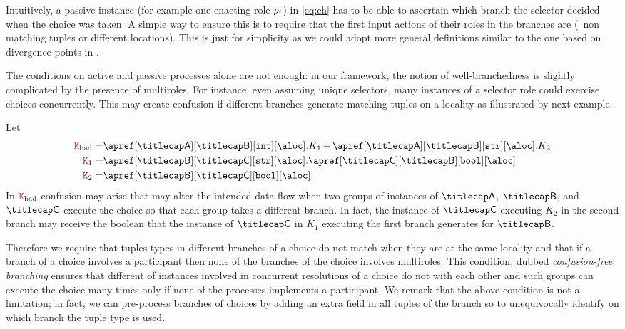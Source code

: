Intuitively, a passive instance (for example one enacting role
$\rho_i$) in \eqref{eq:ch} has to be able to ascertain which branch
the selector decided when the choice was taken.
%
A simple way to ensure this is to require that the first input actions
of their roles in the branches are  (\ie\ non matching
tuples or different locations).
%
This is just for simplicity as we could adopt more general definitions
similar to the one based on divergence points in \cite{gt16,gt17}.

The conditions on active and passive processes alone are not enough:
in our framework, the notion of well-branchedness is slightly
complicated by the presence of multiroles.
%
For instance, even assuming unique selectors, many instances of a
selector role could exercise choices concurrently.
%
This may create confusion if different branches generate matching
tuples on a locality as illustrated by next example.
\begin{example}\label{ex:nonwb}
  Let
  \begin{align*}
    \aK_\mathrm{bad} = & \apref[\amulti A][\amulti B][{\asort[int]}][\aloc] \mkop{.} K_1 \chop \apref[\amulti A][\amulti B][{\asort[str]}][\aloc] \mkop{.} K_2
    \\
    \aK_1 = & \apref[\amulti B][\amulti C][{\asort[str]}][\aloc] \mkop{.} \apref[\amulti C][\amulti B][{\asort[bool]}][\aloc]
    \\
    \aK_2 = & \apref[\amulti B][\amulti C][{\asort[bool]}][\aloc]
  \end{align*}
  In $\aK_\mathrm{bad}$ confusion may arise that may alter the
  intended data flow when two groups of instances of $\amulti A$,
  $\amulti B$, and $\amulti C$ execute the choice so that each group
  takes a different branch.
  In fact, the instance of $\amulti C$ executing $K_2$ in the second
  branch may receive the boolean that the instance of $\amulti C$ in
  $K_1$ executing the first branch generates for $\amulti B$.
  \finex
\end{example}
%
Therefore we require that tuples types in different branches of a
choice do not match when they are at the same locality and that if a
branch of a choice involves a participant then none of the branches of
the choice involves multiroles.
%
This condition, dubbed \emph{confusion-free branching} ensures that
different  of instances involved in concurrent resolutions
of a choice do not  with each other and such groups can
execute the choice many times only if none of the processes implements
a participant.
%
We remark that the above condition is not a limitation; in fact, we
can pre-process branches of choices by adding an extra field in all
tuples of the branch so to unequivocally identify on which branch the
tuple type is used.

